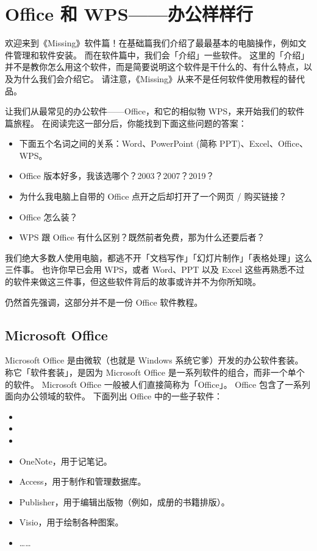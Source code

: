 \chapter{Office 和 WPS——办公样样行}

\begin{note}
  欢迎来到《Missing》软件篇！在基础篇我们介绍了最最基本的电脑操作，例如文件管理和软件安装。
  而在软件篇中，我们会「介绍」一些软件。
  这里的「介绍」并不是教你怎么用这个软件，而是简要说明这个软件是干什么的、有什么特点，以及为什么我们会介绍它。
  请注意，《Missing》从来不是任何软件使用教程的替代品。
\end{note}

\begin{intro}
  让我们从最常见的办公软件——Office，和它的相似物 WPS，来开始我们的软件篇旅程。
  在阅读完这一部分后，你能找到下面这些问题的答案：
  \begin{itemize}
    \item 下面五个名词之间的关系：Word、PowerPoint (简称 PPT)、Excel、Office、WPS。
    \item Office 版本好多，我该选哪个？2003？2007？2019？
    \item 为什么我电脑上自带的 Office 点开之后却打开了一个网页 / 购买链接？
    \item Office 怎么装？
    \item WPS 跟 Office 有什么区别？既然前者免费，那为什么还要后者？
  \end{itemize}
\end{intro}

我们绝大多数人使用电脑，都逃不开「文档写作」「幻灯片制作」「表格处理」这么三件事。
也许你早已会用 WPS，或者 Word、PPT 以及 Excel 这些再熟悉不过的软件来做这三件事，但这些软件背后的故事或许并不为你所知晓。

仍然首先强调，这部分并不是一份 Office 软件教程。

\section{Microsoft Office}

Microsoft Office 是由微软（也就是 Windows 系统它爹）开发的办公软件套装。
称它「软件套装」，是因为 Microsoft Office 是一系列软件的组合，而非一个单个的软件。
Microsoft Office 一般被人们直接简称为「Office」。
Office 包含了一系列面向办公领域的软件。
下面列出 Office 中的一些子软件：

\begin{itemize}
  \item {}
  \item {}
  \item {}
  \item OneNote，用于记笔记。
  \item Access，用于制作和管理数据库。
  \item Publisher，用于编辑出版物（例如，成册的书籍排版）。
  \item Visio，用于绘制各种图案。
  \item ……
\end{itemize}

